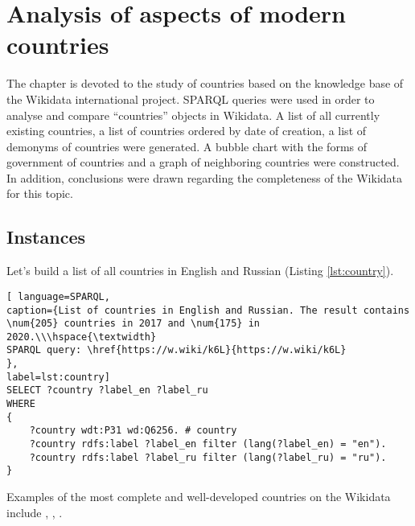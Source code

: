 \setchapterpreamble[u]{\margintoc}
\chapter{Analysis of aspects of modern countries\protect\footnotemark}


The chapter is devoted to the study of countries based on the knowledge base of the Wikidata international project. SPARQL queries were used in order to analyse and compare ``countries'' objects in Wikidata. A list of all currently existing countries, a list of countries ordered by date of creation, a list of demonyms of countries were generated. A bubble chart with the forms of government of countries and a graph of neighboring countries were constructed. In addition, conclusions were drawn regarding the completeness of the Wikidata for this topic.

\section{Instances}

Let's build a list of all countries in English and Russian (Listing \ref{lst:country}).

\begin{lstlisting}[ language=SPARQL, 
caption={List of countries in English and Russian. The result contains \num{205} countries in 2017 and \num{175} in 2020.\\\hspace{\textwidth}
SPARQL query: \href{https://w.wiki/k6L}{https://w.wiki/k6L}
},
label=lst:country]
SELECT ?country ?label_en ?label_ru
WHERE
{
	?country wdt:P31 wd:Q6256. # country
	?country rdfs:label ?label_en filter (lang(?label_en) = "en").
	?country rdfs:label ?label_ru filter (lang(?label_ru) = "ru").
}
\end{lstlisting}


Examples of the most complete and well-developed countries on the Wikidata include , , .


